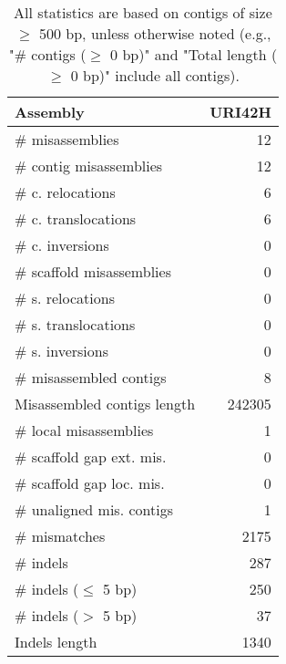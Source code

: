 \documentclass[12pt,a4paper]{article}
\begin{document}
\begin{table}[ht]
\begin{center}
\caption{All statistics are based on contigs of size $\geq$ 500 bp, unless otherwise noted (e.g., "\# contigs ($\geq$ 0 bp)" and "Total length ($\geq$ 0 bp)" include all contigs).}
\begin{tabular}{|l*{1}{|r}|}
\hline
Assembly & URI42H \\ \hline
\# misassemblies & 12 \\ \hline
\hspace{2mm}\# contig misassemblies & 12 \\ \hline
\hspace{5mm}\# c. relocations & 6 \\ \hline
\hspace{5mm}\# c. translocations & 6 \\ \hline
\hspace{5mm}\# c. inversions & 0 \\ \hline
\hspace{2mm}\# scaffold misassemblies & 0 \\ \hline
\hspace{5mm}\# s. relocations & 0 \\ \hline
\hspace{5mm}\# s. translocations & 0 \\ \hline
\hspace{5mm}\# s. inversions & 0 \\ \hline
\# misassembled contigs & 8 \\ \hline
Misassembled contigs length & 242305 \\ \hline
\# local misassemblies & 1 \\ \hline
\# scaffold gap ext. mis. & 0 \\ \hline
\# scaffold gap loc. mis. & 0 \\ \hline
\# unaligned mis. contigs & 1 \\ \hline
\# mismatches & 2175 \\ \hline
\# indels & 287 \\ \hline
\hspace{5mm}\# indels ($\leq$ 5 bp) & 250 \\ \hline
\hspace{5mm}\# indels ($>$ 5 bp) & 37 \\ \hline
Indels length & 1340 \\ \hline
\end{tabular}
\end{center}
\end{table}
\end{document}
